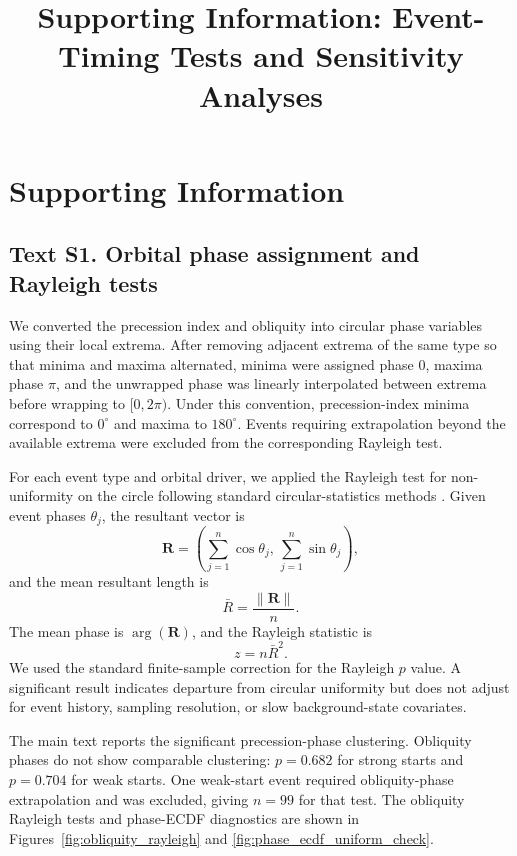 \documentclass[11pt]{article}
\title{Supporting Information: Event-Timing Tests and Sensitivity Analyses}
\author{}
\date{}
\begin{document}
\renewcommand{\thefigure}{S\arabic{figure}}
\renewcommand{\thetable}{S\arabic{table}}
\maketitle

\section*{Supporting Information}

\subsection*{Text S1. Orbital phase assignment and Rayleigh tests}

We converted the precession index and obliquity into circular phase variables using their local extrema. After removing adjacent extrema of the same type so that minima and maxima alternated, minima were assigned phase \(0\), maxima phase \(\pi\), and the unwrapped phase was linearly interpolated between extrema before wrapping to \([0,2\pi)\). Under this convention, precession-index minima correspond to \(0^\circ\) and maxima to \(180^\circ\). Events requiring extrapolation beyond the available extrema were excluded from the corresponding Rayleigh test.

For each event type and orbital driver, we applied the Rayleigh test for non-uniformity on the circle following standard circular-statistics methods \citep{mardia2000directional}. Given event phases \(\theta_j\), the resultant vector is
\[
\mathbf{R} =
\left(
\sum_{j=1}^{n}\cos\theta_j,\,
\sum_{j=1}^{n}\sin\theta_j
\right),
\]
and the mean resultant length is
\[
\bar{R} = \frac{\|\mathbf{R}\|}{n}.
\]
The mean phase is \(\arg(\mathbf{R})\), and the Rayleigh statistic is
\[
z = n\bar{R}^{2}.
\]
We used the standard finite-sample correction for the Rayleigh \(p\) value. A significant result indicates departure from circular uniformity but does not adjust for event history, sampling resolution, or slow background-state covariates.

The main text reports the significant precession-phase clustering. Obliquity phases do not show comparable clustering: \(p=0.682\) for strong starts and \(p=0.704\) for weak starts. One weak-start event required obliquity-phase extrapolation and was excluded, giving \(n=99\) for that test. The obliquity Rayleigh tests and phase-ECDF diagnostics are shown in Figures~\ref{fig:obliquity_rayleigh} and \ref{fig:phase_ecdf_uniform_check}.
\end{document}

